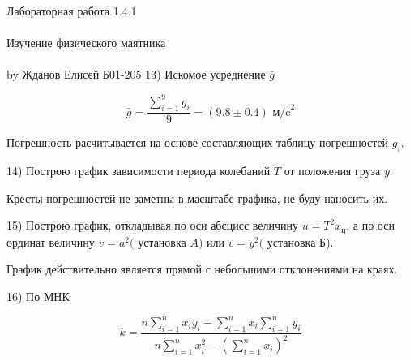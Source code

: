 \documentclass{astroedu-lab}
\begin{document}
\begin{problem}{\huge Лабораторная работа 1.4.1\\\\Изучение физического маятника\\\\by Жданов Елисей Б01-205}
13) Искомое усреднение $\bar{g}$

\begin{equation}
	\bar{g} = \frac{\sum^9_{i = 1} g_i}{9} = (9.8 \pm 0.4) \text{ м/c}^2
\end{equation}

Погрешность расчитывается на основе составляющих таблицу погрешностей $g_i$.

14) Построю график зависимости периода колебаний \(T\) от положения груза \(y\).


\begin{center}
\end{center}

Кресты погрешностей не заметны в масштабе графика, не буду наносить их.

15) Построю график, откладывая по оси абсцисс величину \(u=T^{2} x_{\text {ц}}\), а по оси ординат величину \(v=a^{2}(\) установка \(A)\) или \(v=y^{2}(\) установка Б).

\begin{center}
\end{center}

График действительно является прямой с небольшими отклонениями на краях.

16) По МНК

\begin{equation}
	k = \frac{n \sum_{i = 1}^{n} x_i y_i - \sum_{i = 1}^{n} x_i \sum_{i = 1}^{n} y_i}{n \sum_{i = 1}^{n} x_i^2 - \left(\sum_{i = 1}^{n} x_i\right)^2}
\end{equation}


\end{problem}
\end{document}
